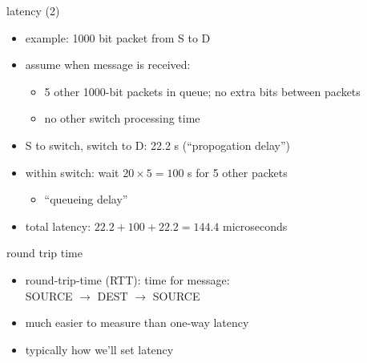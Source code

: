 \begin{frame}{latency (2)}
    \begin{itemize}
    \item example: 1000 bit packet from S to D
    \item assume when message is received:
        \begin{itemize}
        \item 5 other 1000-bit packets in queue; no extra bits between packets
        \item no other switch processing time
        \end{itemize}
    \end{itemize}
\vspace{-.5cm}
\begin{itemize}
\item S to switch, switch to D: 22.2 \mu s {\small (``propogation delay'')}
\item within switch: wait $20\times5=100$ \mu s for 5 other packets
    \begin{itemize}
    \item ``queueing delay''
    \end{itemize}
\item total latency: $22.2 + 100 + 22.2 = 144.4$ microseconds
\end{itemize}
\end{frame}

\begin{frame}{round trip time}
    \begin{itemize}
    \item round-trip-time (RTT): time for message:  \\ SOURCE $\rightarrow$ DEST $\rightarrow$ SOURCE
    \vspace{.5cm}
    \item much easier to measure than one-way latency
    \item typically how we'll set latency
    \end{itemize}
\end{frame}
